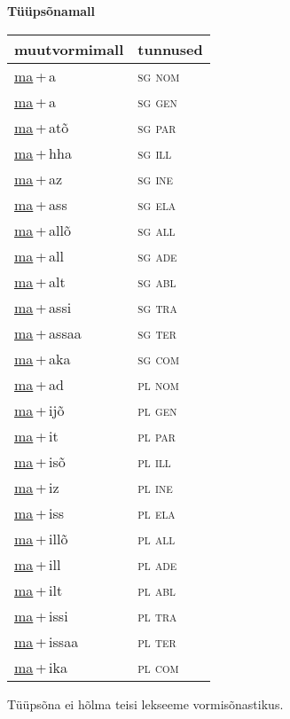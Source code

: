 
\vspace{1.8em}
\begin{minipage}{\textwidth}
\textbf{Tüüpsõnamall \,}\\

\begin{sideways}
\begin{tabular}{l l}
muutvormimall & tunnused \\
\hline
\underline{ma}\,+\,a & \textsc{ sg nom } \\
\underline{ma}\,+\,a & \textsc{ sg gen } \\
\underline{ma}\,+\,atõ & \textsc{ sg par } \\
\underline{ma}\,+\,hha & \textsc{ sg ill } \\
\underline{ma}\,+\,az & \textsc{ sg ine } \\
\underline{ma}\,+\,ass & \textsc{ sg ela } \\
\underline{ma}\,+\,allõ & \textsc{ sg all } \\
\underline{ma}\,+\,all & \textsc{ sg ade } \\
\underline{ma}\,+\,alt & \textsc{ sg abl } \\
\underline{ma}\,+\,assi & \textsc{ sg tra } \\
\underline{ma}\,+\,assaa & \textsc{ sg ter } \\
\underline{ma}\,+\,aka & \textsc{ sg com } \\
\underline{ma}\,+\,ad & \textsc{ pl nom } \\
\underline{ma}\,+\,ijõ & \textsc{ pl gen } \\
\underline{ma}\,+\,it & \textsc{ pl par } \\
\underline{ma}\,+\,isõ & \textsc{ pl ill } \\
\underline{ma}\,+\,iz & \textsc{ pl ine } \\
\underline{ma}\,+\,iss & \textsc{ pl ela } \\
\underline{ma}\,+\,illõ & \textsc{ pl all } \\
\underline{ma}\,+\,ill & \textsc{ pl ade } \\
\underline{ma}\,+\,ilt & \textsc{ pl abl } \\
\underline{ma}\,+\,issi & \textsc{ pl tra } \\
\underline{ma}\,+\,issaa & \textsc{ pl ter } \\
\underline{ma}\,+\,ika & \textsc{ pl com } \\
\end{tabular}
\end{sideways}
\label{tab:tüüpsõnamall-maa}

\end{minipage}

 
\vspace{1em}
\noindent Tüüpsõna ei hõlma teisi lekseeme vormi\-sõnastikus.
